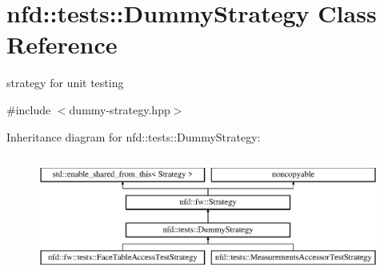\hypertarget{classnfd_1_1tests_1_1DummyStrategy}{}\section{nfd\+:\+:tests\+:\+:Dummy\+Strategy Class Reference}
\label{classnfd_1_1tests_1_1DummyStrategy}


strategy for unit testing  




{\ttfamily \#include $<$dummy-\/strategy.\+hpp$>$}

Inheritance diagram for nfd\+:\+:tests\+:\+:Dummy\+Strategy\+:\begin{figure}[H]
\begin{center}
\leavevmode
\includegraphics[height=3.985765cm]{classnfd_1_1tests_1_1DummyStrategy}
\end{center}
\end{figure}
